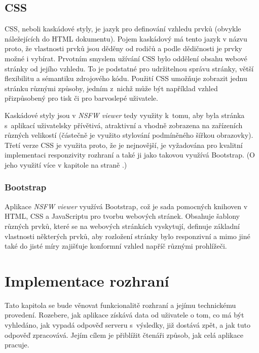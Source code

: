 \documentclass[a4paper, 11pt, oneside, showtrims]{book}
\newcommand{\simplywn}{\textit{NSFW viewer} }
\newcommand{\itNameRef}[1]{\textit{\nameref{#1}}}
\begin{document}
			\section{CSS}

				CSS, neboli kaskádové styly, je jazyk pro definování vzhledu prvků (obvykle náležejících do HTML dokumentu). Pojem kaskádový má tento jazyk v názvu proto, že vlastnosti prvků jsou děděny od rodičů a podle dědičnosti je prvky možné i vybírat. Prvotním smyslem užívání CSS bylo oddělení obsahu webové stránky od jejího vzhledu. To je podstatné pro udržitelnou správu stránky, větší flexibilitu a sémantiku zdrojového kódu. Použití CSS umožňuje zobrazit jednu stránku různými způsoby, jedním z~nichž může být například vzhled přizpůsobený pro tisk či pro barvoslepé uživatele. \parencite{cssWeb}

				Kaskádové styly jsou v \simplywn tedy využity k~tomu, aby byla stránka s~aplikací uživatelsky přívětivá, atraktivní a vhodně zobrazena na zařízeních různých velikostí (částečně je využito stylování podmíněného šířkou obrazovky). Třetí verze CSS je využita proto, že je nejnovější, je vyžadována pro kvalitní implementaci responzivity rozhraní a také ji jako takovou využívá Bootstrap. (O jeho využití více v kapitole \itNameRef{cha:bootstrap} na straně \pageref{cha:bootstrap}.) 

				\subsection{Bootstrap}
				\label{cha:bootstrap}

					Aplikace \simplywn využívá Bootstrap, což je sada pomocných knihoven v HTML, CSS a JavaScriptu pro tvorbu webových stránek. Obsahuje šablony různých prvků, které se na webových stránkách vyskytují, definuje základní vlastnosti některých prvků, aby rozložení stránky bylo responzivní a mimo jiné také do jisté míry zajišťuje konformní vzhled napříč různými prohlížeči. \parencite{bootstrapWeb}

		\chapter{Implementace rozhraní}

			Tato kapitola se bude věnovat funkcionalitě rozhraní a jejímu technickému provedení. Rozebere, jak aplikace získává data od uživatele o tom, co má být vyhledáno, jak vypadá odpověď serveru s~výsledky, již dostává zpět, a jak tuto odpověď zpracovává. Jejím cílem je přiblížit čtenáři způsob, jak celá aplikace pracuje.
\end{document}
